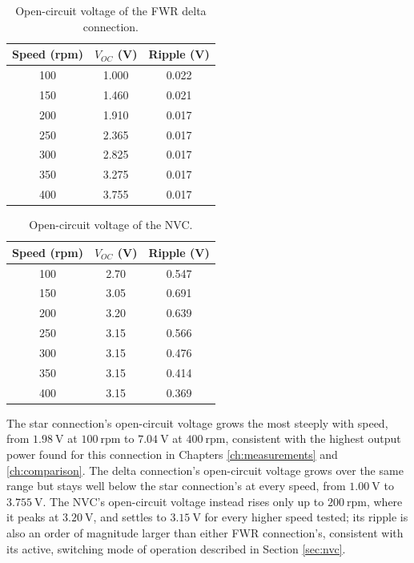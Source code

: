 \begin{table}[htbp]
    \centering
    \begin{tabular}{ccc}
        \toprule
        Speed (rpm) & $V_{OC}$ (V) & Ripple (V) \\
        \midrule
        100 & 1.000 & 0.022 \\
        150 & 1.460 & 0.021 \\
        200 & 1.910 & 0.017 \\
        250 & 2.365 & 0.017 \\
        300 & 2.825 & 0.017 \\
        350 & 3.275 & 0.017 \\
        400 & 3.755 & 0.017 \\
        \bottomrule
    \end{tabular}
    \caption{Open-circuit voltage of the FWR delta connection.}
    \label{tab:pmic_ocv_delta}
\end{table}

\begin{table}[htbp]
    \centering
    \begin{tabular}{ccc}
        \toprule
        Speed (rpm) & $V_{OC}$ (V) & Ripple (V) \\
        \midrule
        100 & 2.70 & 0.547 \\
        150 & 3.05 & 0.691 \\
        200 & 3.20 & 0.639 \\
        250 & 3.15 & 0.566 \\
        300 & 3.15 & 0.476 \\
        350 & 3.15 & 0.414 \\
        400 & 3.15 & 0.369 \\
        \bottomrule
    \end{tabular}
    \caption{Open-circuit voltage of the NVC.}
    \label{tab:pmic_ocv_nvc}
\end{table}

The star connection's open-circuit voltage grows the most steeply with speed, from $1.98\ \text{V}$ at $100\ \text{rpm}$ to $7.04\ \text{V}$ at $400\ \text{rpm}$, consistent with the highest output power found for this connection in Chapters \ref{ch:measurements} and \ref{ch:comparison}. The delta connection's open-circuit voltage grows over the same range but stays well below the star connection's at every speed, from $1.00\ \text{V}$ to $3.755\ \text{V}$. The NVC's open-circuit voltage instead rises only up to $200\ \text{rpm}$, where it peaks at $3.20\ \text{V}$, and settles to $3.15\ \text{V}$ for every higher speed tested; its ripple is also an order of magnitude larger than either FWR connection's, consistent with its active, switching mode of operation described in Section \ref{sec:nvc}.

